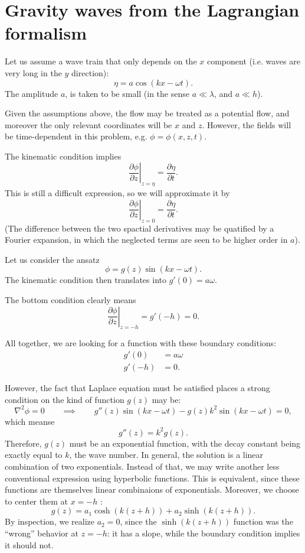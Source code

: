 \section{Gravity waves from the Lagrangian formalism}

Let us assume a wave train that only depends on the $x$ component
(i.e. waves are very long in the $y$ direction):
\[
\eta = a \cos(kx -\omega t) .
\]
The amplitude $a$, is taken to be small (in the sense $a\ll \lambda$,
and $a\ll h$).

Given the assumptions above, the flow may be treated as a potential
flow, and moreover the only relevant coordinates will be $x$ and
$z$. However, the fields will be time-dependent in this problem,
e.g. $\phi=\phi(x,z,t)$.


The kinematic condition  implies
\[
\left. \frac{\partial \phi}{\partial z}\right|_{z=\eta} =
\frac{\partial \eta}{\partial t} .
\]
This is still a difficult expression, so we will approximate it by
\[
\left. \frac{\partial \phi}{\partial z}\right|_{z=0} =
\frac{\partial \eta}{\partial t} .
\]
(The difference between the two spactial derivatives may be quatified
by a Fourier expansion, in which the neglected terms are seen to be
higher order in $a$).

Let us consider the ansatz
\[
\phi = g(z) \sin(kx -\omega t ) .
\]
The kinematic condition then translates into $g'(0)=a\omega$.

The bottom condition clearly means
\[
\left. \frac{\partial \phi}{\partial z}\right|_{z= -h } = g'(-h)= 0 .
\]


All together, we are looking for a function with these boundary
conditions:
\begin{align}
  g'(0) &=  a \omega \\
  g'(-h) &= 0 .
\end{align}

However, the fact that Laplace equation must be satisfied places a
strong condition on the kind of function $g(z)$ may be:
\[
\nabla^2 \phi = 0 \qquad \implies \qquad
g''(z)  \sin(kx -\omega t ) - g(z)  k^2 \sin(kx -\omega t ) = 0 ,
\]
which meanse
\[
g''(z)  = k^2 g(z) .
\]
Therefore, $g(z)$ must be an exponential function, with the decay
constant being exactly equal to $k$, the wave number. In general, the
solution is a linear combination of two exponentials. Instead of that,
we may write another less conventional expression using hyperbolic
functions. This is equivalent, since these functions are themselves
linear combinaions of exponentials. Moreover, we choose to center them
at $x=-h$ :
\[
g(z)  = a_1 \cosh(k(z+h)) + a_2 \sinh(k(z+h)) .
\]
By inspection, we realize $a_2=0$, since the $\sinh(k(z+h))$ function
was the ``wrong'' behavior at $z=-h$: it has a slope, while the
boundary condition implies it should not.

